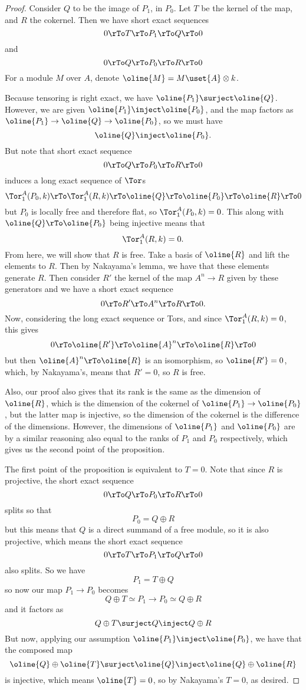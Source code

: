 \documentclass[12 pt]{article}
\theoremstyle{definition}
\renewcommand{\(}{\left(}
\renewcommand{\)}{\right)}
\begin{document}
\begin{proof} Consider $Q$ to be the image of $P_1$, in $P_0$. Let $T$ be the kernel of the map, and $R$ the cokernel. Then we have short exact sequences
\[0 \rTo T \rTo P_1 \rTo Q \rTo 0\]
and
\[0 \rTo Q \rTo P_0 \rTo R \rTo 0\]
For a module $M$ over $A$, denote $\oline{M}=M \uset{A}\otimes k$.

Because tensoring is right exact, we have $\oline{P_1} \surject \oline{Q}$. However, we are given $\oline{P_1} \inject \oline{P_0}$, and the map factors as $\oline{P_1} \to \oline{Q} \to \oline{P_0}$, so we must have
\[\oline{Q} \inject \oline{P_0}.\]
But note that short exact sequence
\[0 \rTo Q \rTo P_0 \rTo R \rTo 0\]
induces a long exact sequence of $\Tor$s
\[\Tor_1^A(P_0, k) \rTo \Tor_1^A(R, k) \rTo \oline{Q} \rTo \oline{P_0} \rTo \oline{R} \rTo 0\]
but $P_0$ is locally free and therefore flat, so $\Tor_1^A(P_0,k)=0$. This along with $\oline{Q} \rTo \oline{P_0}$ being injective means that
\[\Tor_1^A(R, k)=0.\]
From here, we will show that $R$ is free. Take a basis of $\oline{R}$ and lift the elements to $R$. Then by Nakayama's lemma, we have that these elements generate $R$. Then consider $R'$ the kernel of the map $A^n \to R$ given by these generators and we have a short exact sequence
\[0 \rTo R' \rTo A^n \rTo R \rTo 0.\]
Now, considering the long exact sequence or Tors, and since $\Tor_1^A(R,k)=0$, this gives
\[0 \rTo \oline{R'} \rTo \oline{A}^n \rTo \oline{R} \rTo 0\]
but then $\oline{A}^n \rTo \oline{R}$ is an isomorphism, so $\oline{R'}=0$, which, by Nakayama's, means that $R'=0$, so $R$ is free.

Also, our proof also gives that its rank is the same as the dimension of $\oline{R}$, which is the dimension of the cokernel of $\oline{P_1} \to \oline{P_0}$, but the latter map is injective, so the dimension of the cokernel is the difference of the dimensions. However, the dimensions of $\oline{P_1}$ and $\oline{P_0}$ are by a similar reasoning also equal to the ranks of $P_1$ and $P_0$ respectively, which gives us the second point of the proposition.

The first point of the proposition is equivalent to $T=0$. Note that since $R$ is projective, the short exact sequence
\[0 \rTo Q \rTo P_0 \rTo R \rTo 0\]
splits so that
\[P_0=Q \oplus R\]
but this means that $Q$ is a direct summand of a free module, so it is also projective, which means the short exact sequence
\[0 \rTo T \rTo P_1 \rTo Q \rTo 0\]
also splits. So we have
\[P_1=T \oplus Q\]
so now our map $P_1 \to P_0$ becomes
\[Q \oplus T \simeq P_1 \to P_0 \simeq Q \oplus R\]
and it factors as
\[Q \oplus T \surject Q \inject Q \oplus R\]
But now, applying our assumption $\oline{P_1} \inject \oline{P_0}$, we have that the composed map
\[\oline{Q} \oplus \oline{T} \surject \oline{Q} \inject \oline{Q} \oplus \oline{R}\]
is injective, which means $\oline{T}=0$, so by Nakayama's $T=0$, as desired.
\end{proof}
\end{document}
